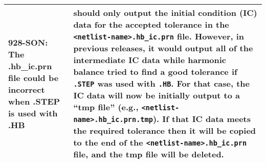 {\begin{longtable}[h] {>{\raggedright\small}m{2in}|>{\raggedright\let\\\tabularnewline\small}m{3.5in}}
\textbf{928-SON}: The .hb\_ic.prn file could be incorrect when .STEP is
used with .HB & \Xyce{} should only output the initial condition (IC)
data for the accepted tolerance in the \texttt{<netlist-name>.hb\_ic.prn}
file.  However, in previous releases, it would output all of the
intermediate IC data while harmonic balance tried to find a good
tolerance if \texttt{.STEP} was used with \texttt{.HB}. For that
case, the IC data will now be initially output to a ``tmp file''
(e.g., \texttt{<netlist-name>.hb\_ic.prn.tmp}). If that IC data meets
the required tolerance then it will be copied to the end of the
\texttt{<netlist-name>.hb\_ic.prn} file, and the tmp file 
will be deleted. \\ \hline

\end{longtable}
}
